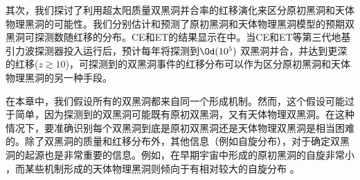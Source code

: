 其次，我们探讨了利用超太阳质量双黑洞并合率的红移演化来区分原初黑洞和天体物理黑洞的可能性。我们分别估计和预测了原初黑洞和天体物理黑洞模型的预期双黑洞可探测数随红移的分布。CE和ET的结果显示在中。当CE和ET等第三代地基引力波探测器投入运行后，预计每年将探测到$\Od(10^5)$ 双黑洞并合，并达到更深的红移($z \gtrsim 10$)，可探测到的双黑洞事件的红移分布可以作为区分原初黑洞和天体物理黑洞的另一种手段。

在本章中，我们假设所有的双黑洞都来自同一个形成机制。然而，这个假设可能过于简单，因为\lvc 探测到的双黑洞可能既有原初双黑洞，又有天体物理双黑洞。在这种情况下，要准确识别每个双黑洞到底是原初双黑洞还是天体物理双黑洞是相当困难的。除了双黑洞的质量和红移分布外，其他信息（例如自旋分布），对于确定双黑洞的起源也是非常重要的信息。例如，在早期宇宙中形成的原初黑洞的自旋非常小\cite{Chiba:2017rvs,Mirbabayi:2019uph,DeLuca:2019buf} ，而某些机制形成的天体物理黑洞则倾向于有相对较大的自旋分布 \cite{Kinugawa:2016ect}。